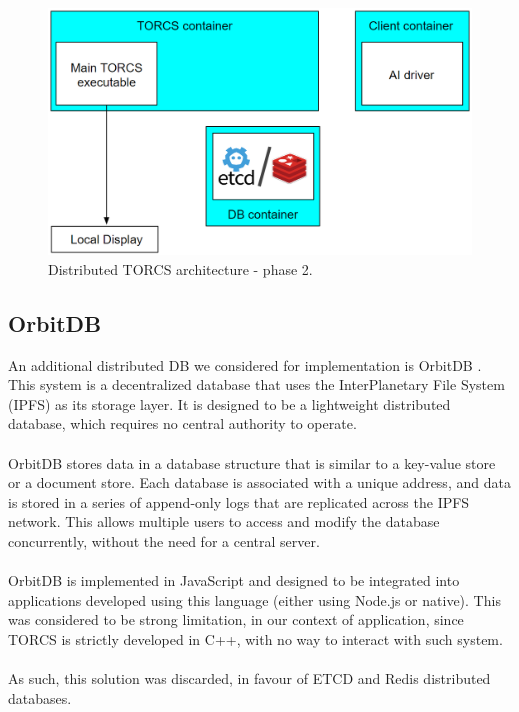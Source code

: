 \begin{figure}[h!]
	\centering
	\includegraphics[width=0.8\linewidth]{"immagini/Software development/Development-2"}
	\caption[Distributed TORCS architecture - phase 2.]{Distributed TORCS architecture - phase 2.}
	\label{fig:development-2}
\end{figure}

\subsection{OrbitDB}
An additional distributed DB we considered for implementation is OrbitDB \cite{site:orbitdb}. This system is a decentralized database that uses the InterPlanetary File System (IPFS) as its storage layer. It is designed to be a lightweight distributed database, which requires no central authority to operate. \\ \\
OrbitDB stores data in a database structure that is similar to a key-value store or a document store. Each database is associated with a unique address, and data is stored in a series of append-only logs that are replicated across the IPFS network. This allows multiple users to access and modify the database concurrently, without the need for a central server. \\ \\
OrbitDB is implemented in JavaScript and designed to be integrated into applications developed using this language (either using Node.js or native). This was considered to be strong limitation, in our context of application, since TORCS is strictly developed in C++, with no way to interact with such system. \\ \\
As such, this solution was discarded, in favour of ETCD and Redis distributed databases.

